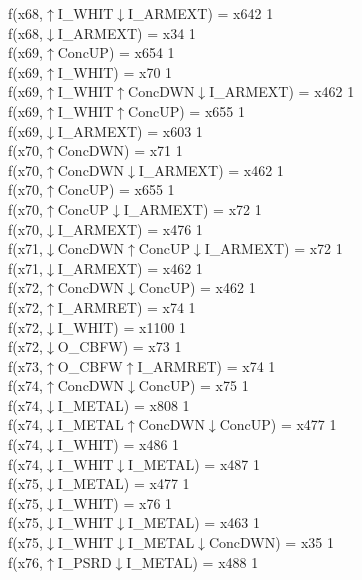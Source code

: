 f(x68,$\uparrow$I\_WHIT$\downarrow$I\_ARMEXT) = x642 {1} \\
f(x68,$\downarrow$I\_ARMEXT) = x34 {1} \\
f(x69,$\uparrow$ConcUP) = x654 {1} \\
f(x69,$\uparrow$I\_WHIT) = x70 {1} \\
f(x69,$\uparrow$I\_WHIT$\uparrow$ConcDWN$\downarrow$I\_ARMEXT) = x462 {1} \\
f(x69,$\uparrow$I\_WHIT$\uparrow$ConcUP) = x655 {1} \\
f(x69,$\downarrow$I\_ARMEXT) = x603 {1} \\
f(x70,$\uparrow$ConcDWN) = x71 {1} \\
f(x70,$\uparrow$ConcDWN$\downarrow$I\_ARMEXT) = x462 {1} \\
f(x70,$\uparrow$ConcUP) = x655 {1} \\
f(x70,$\uparrow$ConcUP$\downarrow$I\_ARMEXT) = x72 {1} \\
f(x70,$\downarrow$I\_ARMEXT) = x476 {1} \\
f(x71,$\downarrow$ConcDWN$\uparrow$ConcUP$\downarrow$I\_ARMEXT) = x72 {1} \\
f(x71,$\downarrow$I\_ARMEXT) = x462 {1} \\
f(x72,$\uparrow$ConcDWN$\downarrow$ConcUP) = x462 {1} \\
f(x72,$\uparrow$I\_ARMRET) = x74 {1} \\
f(x72,$\downarrow$I\_WHIT) = x1100 {1} \\
f(x72,$\downarrow$O\_CBFW) = x73 {1} \\
f(x73,$\uparrow$O\_CBFW$\uparrow$I\_ARMRET) = x74 {1} \\
f(x74,$\uparrow$ConcDWN$\downarrow$ConcUP) = x75 {1} \\
f(x74,$\downarrow$I\_METAL) = x808 {1} \\
f(x74,$\downarrow$I\_METAL$\uparrow$ConcDWN$\downarrow$ConcUP) = x477 {1} \\
f(x74,$\downarrow$I\_WHIT) = x486 {1} \\
f(x74,$\downarrow$I\_WHIT$\downarrow$I\_METAL) = x487 {1} \\
f(x75,$\downarrow$I\_METAL) = x477 {1} \\
f(x75,$\downarrow$I\_WHIT) = x76 {1} \\
f(x75,$\downarrow$I\_WHIT$\downarrow$I\_METAL) = x463 {1} \\
f(x75,$\downarrow$I\_WHIT$\downarrow$I\_METAL$\downarrow$ConcDWN) = x35 {1} \\
f(x76,$\uparrow$I\_PSRD$\downarrow$I\_METAL) = x488 {1} \\
